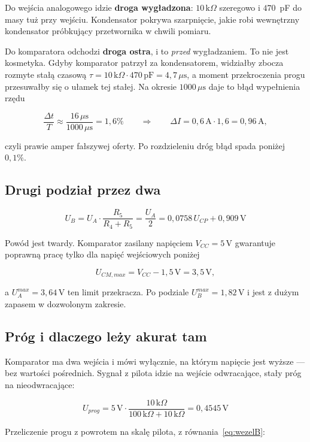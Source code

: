 \documentclass[a4paper,11pt]{article}
\newcommand{\kohm}{\,\mathrm{k}\Omega}
\newcommand{\volt}{\,\mathrm{V}}
\newcommand{\amp}{\,\mathrm{A}}
\newcommand{\us}{\,\mu\mathrm{s}}
\begin{document}
Do wejścia analogowego idzie \textbf{droga wygładzona}: $10\kohm$ szeregowo
i $470$~pF do masy tuż przy wejściu. Kondensator pokrywa szarpnięcie, jakie robi
wewnętrzny kondensator próbkujący przetwornika w chwili pomiaru.

Do komparatora odchodzi \textbf{droga ostra}, i to \emph{przed} wygładzaniem.
To nie jest kosmetyka. Gdyby komparator patrzył za kondensatorem, widziałby zbocza
rozmyte stałą czasową $\tau = 10\kohm\cdot470\,\mathrm{pF}=4{,}7\us$, a moment
przekroczenia progu przesuwałby się o ułamek tej stałej. Na okresie $1000\us$
daje to błąd wypełnienia rzędu

\[
\frac{\Delta t}{T}\approx\frac{16\us}{1000\us}=1{,}6\%
\qquad\Rightarrow\qquad
\Delta I = 0{,}6\amp\cdot1{,}6 = 0{,}96\amp,
\]

czyli prawie amper fałszywej oferty. Po rozdzieleniu dróg błąd spada poniżej
$0{,}1\%$.

\subsection{Drugi podział przez dwa}

\begin{equation}
U_B=U_A\cdot\frac{R_5}{R_4+R_5}=\frac{U_A}{2}=0{,}0758\,U_{CP}+0{,}909\volt
\label{eq:wezelB}
\end{equation}

Powód jest twardy. Komparator zasilany napięciem $V_{CC}=5\volt$ gwarantuje
poprawną pracę tylko dla napięć wejściowych poniżej

\[
U_{CM,max}=V_{CC}-1{,}5\volt=3{,}5\volt ,
\]

a $U_A^{max}=3{,}64\volt$ ten limit przekracza. Po podziale
$U_B^{max}=1{,}82\volt$ i jest z dużym zapasem w dozwolonym zakresie.

\subsection{Próg i dlaczego leży akurat tam}
\label{sec:prog}

Komparator ma dwa wejścia i mówi wyłącznie, na którym napięcie jest wyższe --- bez
wartości pośrednich. Sygnał z pilota idzie na wejście odwracające, stały próg na
nieodwracające:

\begin{equation}
U_{prog}=5\volt\cdot\frac{10\kohm}{100\kohm+10\kohm}=0{,}4545\volt
\label{eq:prog}
\end{equation}

Przeliczenie progu z powrotem na skalę pilota, z równania~\eqref{eq:wezelB}:
\end{document}
